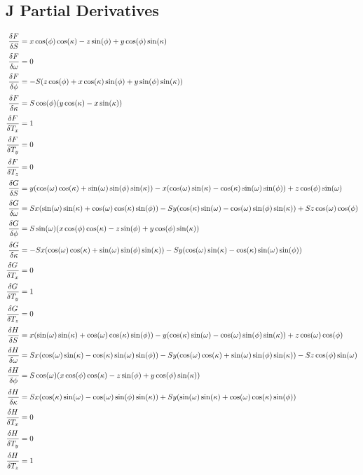 \subsection{J Partial Derivatives}
\begin{align*}
\frac{\delta F}{\delta S} &= x\cos(\phi)\cos(\kappa) - z\sin(\phi) + y\cos(\phi)\sin(\kappa)\\[0.5ex]
\frac{\delta F}{\delta \omega} &= 0\\[0.5ex]
\frac{\delta F}{\delta \phi} &= -S(z\cos(\phi) + x\cos(\kappa)\sin(\phi) + y\sin(\phi)\sin(\kappa))\\[0.5ex]
\frac{\delta F}{\delta \kappa} &= S\cos(\phi)(y\cos(\kappa) - x\sin(\kappa))\\[0.5ex]
\frac{\delta F}{\delta T_x} &= 1\\[0.5ex]
\frac{\delta F}{\delta T_y} &= 0\\[0.5ex]
\frac{\delta F}{\delta T_z} &= 0\\[0.5ex]
\frac{\delta G}{\delta S} &= y(\cos(\omega)\cos(\kappa) + \sin(\omega)\sin(\phi)\sin(\kappa)) - x(\cos(\omega)\sin(\kappa) - \cos(\kappa)\sin(\omega)\sin(\phi)) + z\cos(\phi)\sin(\omega)\\[0.5ex]
\frac{\delta G}{\delta \omega} &= Sx(\sin(\omega)\sin(\kappa) + \cos(\omega)\cos(\kappa)\sin(\phi)) - Sy(\cos(\kappa)\sin(\omega) - \cos(\omega)\sin(\phi)\sin(\kappa)) + Sz\cos(\omega)\cos(\phi)\\[0.5ex]
\frac{\delta G}{\delta \phi} &= S\sin(\omega)(x\cos(\phi)\cos(\kappa) - z\sin(\phi) + y\cos(\phi)\sin(\kappa))\\[0.5ex]
\frac{\delta G}{\delta \kappa} &= - Sx(\cos(\omega)\cos(\kappa) + \sin(\omega)\sin(\phi)\sin(\kappa)) - Sy(\cos(\omega)\sin(\kappa) - \cos(\kappa)\sin(\omega)\sin(\phi))\\[0.5ex]
\frac{\delta G}{\delta T_x} &= 0\\[0.5ex]
\frac{\delta G}{\delta T_y} &= 1\\[0.5ex]
\frac{\delta G}{\delta T_z} &= 0\\[0.5ex]
\frac{\delta H}{\delta S} &= x(\sin(\omega)\sin(\kappa) + \cos(\omega)\cos(\kappa)\sin(\phi)) - y(\cos(\kappa)\sin(\omega) - \cos(\omega)\sin(\phi)\sin(\kappa)) + z\cos(\omega)\cos(\phi)\\[0.5ex]
\frac{\delta H}{\delta \omega} &= Sx(\cos(\omega)\sin(\kappa) - \cos(\kappa)\sin(\omega)\sin(\phi)) - Sy(\cos(\omega)\cos(\kappa) + \sin(\omega)\sin(\phi)\sin(\kappa)) - Sz\cos(\phi)\sin(\omega)\\[0.5ex]
\frac{\delta H}{\delta \phi} &= S\cos(\omega)(x\cos(\phi)\cos(\kappa) - z\sin(\phi) + y\cos(\phi)\sin(\kappa))\\[0.5ex]
\frac{\delta H}{\delta \kappa} &= Sx(\cos(\kappa)\sin(\omega) - \cos(\omega)\sin(\phi)\sin(\kappa)) + Sy(\sin(\omega)\sin(\kappa) + \cos(\omega)\cos(\kappa)\sin(\phi))\\[0.5ex]
\frac{\delta H}{\delta T_x} &= 0\\[0.5ex]
\frac{\delta H}{\delta T_y} &= 0\\[0.5ex]
\frac{\delta H}{\delta T_z} &= 1
\end{align*}
\clearpage
